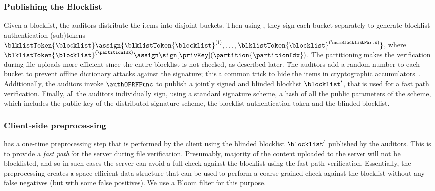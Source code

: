 \subsubsection{Publishing the Blocklist}
%
Given a blocklist, the auditors distribute the items into \numBlocklistParts disjoint buckets. Then using \distSigningFunc, they sign each bucket separately to generate \numBlocklistParts blocklist authentication (sub)tokens $\blklistToken{\blocklist} \assign \{ \blklistToken{\blocklist}^{(1)}, \dots, \blklistToken{\blocklist}^{(\numBlocklistParts)}\}$, where $\blklistToken{\blocklist}^{(\partitionIdx)} \assign \sign[\privKey](\partition{\partitionIdx})$. The partitioning makes the verification during file uploads more efficient since the entire blocklist is not checked, as described later. The auditors add a random number to each bucket to prevent offline dictionary attacks against the signature; this a common trick to hide the items in cryptographic accumulators~\cite{li2007universal}. 
 Additionally, the auditors invoke $\authOPRFFunc$ to publish a jointly signed and blinded blocklist $\blocklist'$, that is used for a fast path verification. Finally, all the auditors individually sign, using a standard signature scheme, a hash of all the public parameters of the scheme, which includes the public key of the distributed signature scheme, the blocklist authentication token and the blinded blocklist. 






\subsubsection{Client-side preprocessing}
%
\protocolEM has a one-time preprocessing step that is performed by the client using the blinded blocklist $\blocklist'$ published by the auditors. This is to provide a \emph{fast path} for the server during file verification. Presumably, majority of the content uploaded to the server will not be blocklisted, and so in such cases the server can avoid a full check against the blocklist using the fast path verification. Essentially, the preprocessing creates a space-efficient data structure that can be used to perform a coarse-grained check against the blocklist without any false negatives (but with some false positives). We use a Bloom filter for this purpose. 

